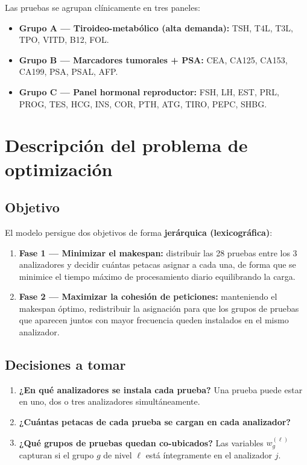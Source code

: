 \documentclass[12pt, a4paper]{article}
\begin{document}
Las pruebas se agrupan clínicamente en tres paneles:
\begin{itemize}
  \item \textbf{Grupo A — Tiroideo-metabólico (alta demanda):} TSH, T4L, T3L, TPO, VITD, B12, FOL.
  \item \textbf{Grupo B — Marcadores tumorales + PSA:} CEA, CA125, CA153, CA199, PSA, PSAL, AFP.
  \item \textbf{Grupo C — Panel hormonal reproductor:} FSH, LH, EST, PRL, PROG, TES, HCG, INS, COR, PTH, ATG, TIRO, PEPC, SHBG.
\end{itemize}

\clearpage
\section{Descripción del problema de optimización}

\subsection{Objetivo}

El modelo persigue dos objetivos de forma \textbf{jerárquica (lexicográfica)}:

\begin{enumerate}
  \item \textbf{Fase 1 — Minimizar el makespan:} distribuir las 28 pruebas entre los 3
        analizadores y decidir cuántas petacas asignar a cada una, de forma que se minimice
        el tiempo máximo de procesamiento diario equilibrando la carga.
  \item \textbf{Fase 2 — Maximizar la cohesión de peticiones:} manteniendo el makespan
        óptimo, redistribuir la asignación para que los grupos de pruebas que aparecen
        juntos con mayor frecuencia queden instalados en el mismo analizador.
\end{enumerate}

\subsection{Decisiones a tomar}

\begin{enumerate}
  \item \textbf{¿En qué analizadores se instala cada prueba?} Una prueba puede estar en uno,
        dos o tres analizadores simultáneamente.
  \item \textbf{¿Cuántas petacas de cada prueba se cargan en cada analizador?}
  \item \textbf{¿Qué grupos de pruebas quedan co-ubicados?} Las variables $w_g^{(\ell)}$
        capturan si el grupo $g$ de nivel $\ell$ está íntegramente en el analizador $j$.
\end{enumerate}
\end{document}
